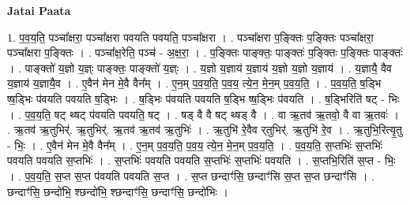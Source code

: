 \documentclass[17pt]{extarticle}
\begin{document}
\textbf{Jatai Paata} \newline

1. प॒व॒य॒ति॒ पञ्चा᳚क्षरा॒ पञ्चा᳚क्षरा पवयति पवयति॒ पञ्चा᳚क्षरा । . पञ्चा᳚क्षरा प॒ङ्क्तिः प॒ङ्क्तिः पञ्चा᳚क्षरा॒ पञ्चा᳚क्षरा प॒ङ्क्तिः । . पञ्चा᳚क्ष॒रेति॒ पञ्च॑ - अ॒क्ष॒रा॒ । . प॒ङ्क्तिः पाङ्क्तः॒ पाङ्क्तः॑ प॒ङ्क्तिः प॒ङ्क्तिः पाङ्क्तः॑ । . पाङ्क्तो॑ य॒ज्ञो य॒ज्ञ्ः पाङ्क्तः॒ पाङ्क्तो॑ य॒ज्ञ्ः । . य॒ज्ञो य॒ज्ञाय॑ य॒ज्ञाय॑ य॒ज्ञो य॒ज्ञो य॒ज्ञाय॑ । . य॒ज्ञायै॒ वैव य॒ज्ञाय॑ य॒ज्ञायै॒व । . ए॒वैन॑ मेन मे॒वै वैन᳚म् । . ए॒न॒म् प॒व॒य॒ति॒ प॒व॒य॒ त्ये॒न॒ मे॒न॒म् प॒व॒य॒ति॒ । . प॒व॒य॒ति॒ ष॒ड्भि ष्ष॒ड्भिः प॑वयति पवयति ष॒ड्भिः । . ष॒ड्भिः प॑वयति पवयति ष॒ड्भि ष्ष॒ड्भिः प॑वयति । . ष॒ड्भिरिति॑ षट् - भिः । . प॒व॒य॒ति॒ षट् थ्षट् प॑वयति पवयति॒ षट् । . षड् वै वै षट् थ्षड् वै । . वा ऋ॒तव॑ ऋ॒तवो॒ वै वा ऋ॒तवः॑ । . ऋ॒तव॑ ऋ॒तुभिर्॑. ऋ॒तुभिर्॑. ऋ॒तव॑ ऋ॒तव॑ ऋ॒तुभिः॑ । . ऋ॒तुभि॑ रे॒वैव र्‌तुभिर्॑. ऋ॒तुभि॑ रे॒व । . ऋ॒तुभि॒रित्यृ॒तु - भिः॒ । . ए॒वैन॑ मेन मे॒वै वैन᳚म् । . ए॒न॒म् प॒व॒य॒ति॒ प॒व॒य॒ त्ये॒न॒ मे॒न॒म् प॒व॒य॒ति॒ । . प॒व॒य॒ति॒ स॒प्तभिः॑ स॒प्तभिः॑ पवयति पवयति स॒प्तभिः॑ । . स॒प्तभिः॑ पवयति पवयति स॒प्तभिः॑ स॒प्तभिः॑ पवयति । . स॒प्तभि॒रिति॑ स॒प्त - भिः॒ । . प॒व॒य॒ति॒ स॒प्त स॒प्त प॑वयति पवयति स॒प्त । . स॒प्त छन्दाꣳ॑सि॒ छन्दाꣳ॑सि स॒प्त स॒प्त छन्दाꣳ॑सि । . छन्दाꣳ॑सि॒ छन्दो॑भि॒ श्छन्दो॑भि॒ श्छन्दाꣳ॑सि॒ छन्दाꣳ॑सि॒ छन्दो॑भिः । \newline
\end{document}
